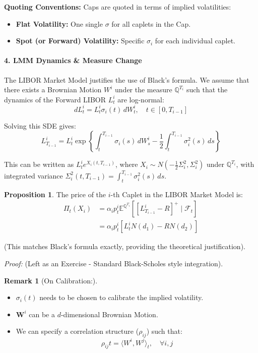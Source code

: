 \documentclass[12pt,a4paper]{article}
\theoremstyle{definition}
\newtheorem{proposition}{Proposition}[section]
\newtheorem{remark}{Remark}[section]
\newcommand{\Q}{\mathbb{Q}}
\newcommand{\E}{\mathbb{E}}
\begin{document}
\textbf{Quoting Conventions:} Caps are quoted in terms of implied volatilities:
\begin{itemize}
\item \textbf{Flat Volatility:} One single $\sigma$ for all caplets in the Cap.
\item \textbf{Spot (or Forward) Volatility:} Specific $\sigma_i$ for each individual caplet.
\end{itemize}

\paragraph{4. LMM Dynamics \& Measure Change}

The LIBOR Market Model justifies the use of Black's formula. We assume that there exists a Brownian Motion $W^i$ under the measure $\Q^{T_i}$ such that the dynamics of the Forward LIBOR $L_t^i$ are log-normal:
\[
dL_t^i = L_t^i \sigma_i(t)\,dW_t^i, \quad t \in [0, T_{i-1}]
\]

Solving this SDE gives:
\[
L_{T_{i-1}}^i = L_t^i \exp\left\{\int_t^{T_{i-1}} \sigma_i(s)\,dW_s^i - \frac{1}{2}\int_t^{T_{i-1}} \sigma_i^2(s)\,ds\right\}
\]

This can be written as $L_t^i e^{X_i(t, T_{i-1})}$, where $X_i \sim N(-\frac{1}{2}\Sigma_i^2, \Sigma_i^2)$ under $\Q^{T_i}$, with integrated variance $\Sigma_i^2(t, T_{i-1}) = \int_t^{T_{i-1}} \sigma_i^2(s)\,ds$.

\begin{proposition}
The price of the $i$-th Caplet in the LIBOR Market Model is:
\[
\begin{aligned}
\Pi_t(X_i) &= \alpha_i p_t^i \E^{\Q^{T_i}}[[L_{T_{i-1}}^i - R]^+ \mid \mathcal{F}_t] \\
&= \alpha_i p_t^i [L_t^i N(d_1) - RN(d_2)]
\end{aligned}
\]

(This matches Black's formula exactly, providing the theoretical justification).
\end{proposition}

\textit{Proof:} (Left as an Exercise - Standard Black-Scholes style integration).

\begin{remark}[On Calibration:]
\begin{itemize}
\item $\sigma_i(t)$ needs to be chosen to calibrate the implied volatility.
\item $\boldsymbol{W}^i$ can be a $d$-dimensional Brownian Motion.
\item We can specify a correlation structure ($\rho_{ij}$) such that:
\[
\rho_{ij} t = \langle W^i, W^j \rangle_t, \quad \forall i,j
\]
\end{itemize}
\end{remark}
\end{document}
